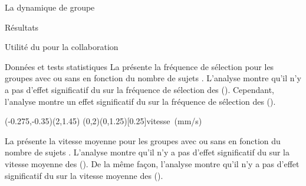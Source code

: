 \documentclass[myfrancais,ngerman,english,frenchb]{mythesis}
\begin{document}
\begin{mychapter}{La dynamique de groupe}
\begin{mysection}{Résultats}
\begin{mysubsection}{Utilité du \mybrainstorming pour la collaboration}
\begin{mysubsubsection}{Données et tests statistiques}
					La  présente la fréquence de sélection  pour les groupes avec ou sans \mybrainstorming {} en fonction du nombre de sujets .
					L'analyse montre qu'il n'y a pas d'effet significatif du \mybrainstorming {} sur la fréquence de sélection  des  ().
					Cependant, l'analyse montre un effet significatif du \mybrainstorming {} sur la fréquence de sélection  des  ().

					\begin{myfigure}
						\begin{myps}(-0.275,-0.35)(2,1.45)
							\myaxes(0,2){\mybrainstorming}(0,1.25)[0.25]{vitesse~(mm/s)}
						\end{myps}
					\end{myfigure}

					La  présente la vitesse moyenne  pour les groupes avec ou sans \mybrainstorming {} en fonction du nombre de sujets .
					L'analyse montre qu'il n'y a pas d'effet significatif du \mybrainstorming {} sur la vitesse moyenne  des  ().
					De la même façon, l'analyse montre qu'il n'y a pas d'effet significatif du \mybrainstorming {} sur la vitesse moyenne  des  ().


\end{mysubsubsection}
\end{mysubsection}
\end{mysection}
\end{mychapter}
\end{document}
